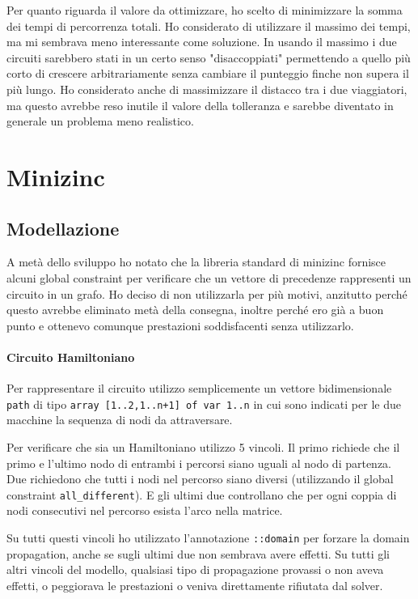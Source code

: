 \documentclass[12pt, a4paper]{article}
\begin{document}
Per quanto riguarda il valore da ottimizzare, ho scelto di minimizzare la somma dei tempi di percorrenza totali.
Ho considerato di utilizzare il massimo dei tempi, ma mi sembrava meno interessante come soluzione. In usando il massimo i due circuiti sarebbero stati in un certo senso "disaccoppiati" permettendo a quello più corto di crescere arbitrariamente senza cambiare il punteggio finche non supera il più lungo.
Ho considerato anche di massimizzare il distacco tra i due viaggiatori, ma questo avrebbe reso inutile il valore della tolleranza e sarebbe diventato in generale un problema meno realistico.

\section{Minizinc}

\subsection{Modellazione}

A metà dello sviluppo ho notato che la libreria standard di minizinc fornisce alcuni global constraint per verificare che un vettore di precedenze rappresenti un circuito in un grafo. Ho deciso di non utilizzarla per più motivi, anzitutto perché questo avrebbe eliminato metà della consegna, inoltre perché ero già a buon punto e ottenevo comunque prestazioni soddisfacenti senza utilizzarlo.

\paragraph{Circuito Hamiltoniano}
Per rappresentare il circuito utilizzo semplicemente un vettore bidimensionale \lstinline{path} di tipo \lstinline{array [1..2,1..n+1] of var 1..n} in cui sono indicati per le due macchine la sequenza di nodi da attraversare.

Per verificare che sia un Hamiltoniano utilizzo 5 vincoli. Il primo richiede che il primo e l'ultimo nodo di entrambi i percorsi siano uguali al nodo di partenza.
Due richiedono che tutti i nodi nel percorso siano diversi (utilizzando il global constraint \lstinline{all_different}). E gli ultimi due controllano che per ogni coppia di nodi consecutivi nel percorso esista l'arco nella matrice.

Su tutti questi vincoli ho utilizzato l'annotazione \lstinline{::domain} per forzare la domain propagation, anche se sugli ultimi due non sembrava avere effetti. Su tutti gli altri vincoli del modello, qualsiasi tipo di propagazione provassi o non aveva effetti, o peggiorava le prestazioni o veniva direttamente rifiutata dal solver.
\end{document}
